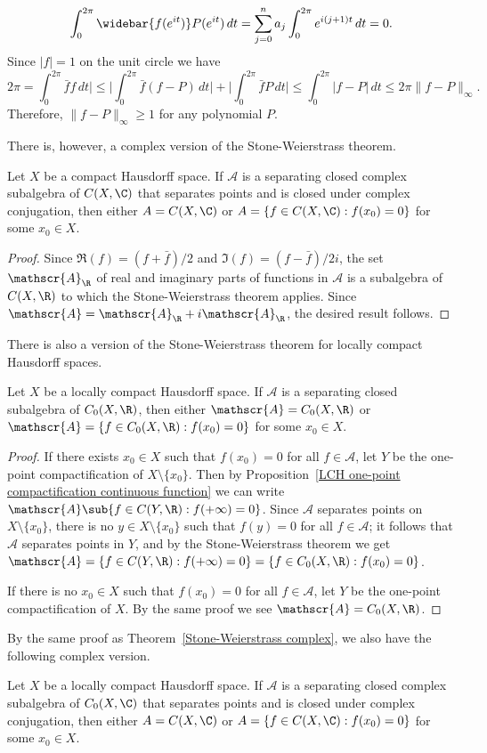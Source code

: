 \[\int_{0}^{2\pi}\widebar{f(e^{it})}P(e^{it})\,dt=\sum_{j=0}^{n}a_j\int_0^{2\pi}e^{i(j+1)t}\,dt=0.\]
Since $|f|=1$ on the unit circle we have
\[2\pi=\int_0^{2\pi}\bar{f}f\,dt\Big|\leq\Big|\int_0^{2\pi}\bar{f}(f-P)\,dt\Big|+\Big|\int_0^{2\pi}\bar{f}P\,dt\Big|\leq\int_0^{2\pi}|f-P|\,dt\leq 2\pi\|f-P\|_\infty.\]
Therefore, $\|f-P\|_\infty\geq 1$ for any polynomial $P$.\par
There is, however, a complex version of the Stone-Weierstrass theorem.
\begin{theorem}\label{Stone-Weierstrass complex}
Let $X$ be a compact Hausdorff space. If $\mathscr{A}$ is a separating closed complex subalgebra of $C(X,\C)$ that separates points and is closed under complex conjugation, then either $A=C(X,\C)$ or $A=\{f\in C(X,\C):f(x_0)=0\}$ for some $x_0\in X$.
\end{theorem}
\begin{proof}
Since $\Re(f)=(f+\bar{f})/2$ and $\Im(f)=(f-\bar{f})/2i$, the set $\mathscr{A}_{\R}$ of real and imaginary parts of functions in $\mathscr{A}$ is a subalgebra of $C(X,\R)$ to which the Stone-Weierstrass theorem applies. Since $\mathscr{A}=\mathscr{A}_{\R}+i\mathscr{A}_{\R}$, the desired result follows.
\end{proof}
There is also a version of the Stone-Weierstrass theorem for locally compact Hausdorff spaces.
\begin{theorem}
Let $X$ be a locally compact Hausdorff space. If $\mathscr{A}$ is a separating closed subalgebra of $C_0(X,\R)$, then either $\mathscr{A}=C_0(X,\R)$ or $\mathscr{A}=\{f\in C_0(X,\R):f(x_0)=0\}$ for some $x_0\in X$.
\end{theorem}
\begin{proof}
If there exists $x_0\in X$ such that $f(x_0)=0$ for all $f\in\mathscr{A}$, let $Y$ be the one-point compactification of $X\setminus\{x_0\}$. Then by Proposition~\ref{LCH one-point compactification continuous function} we can write $\mathscr{A}\sub\{f\in C(Y,\R):f(+\infty)=0\}$. Since $\mathscr{A}$ separates points on $X\setminus\{x_0\}$, there is no $y\in X\setminus\{x_0\}$ such that $f(y)=0$ for all $f\in\mathscr{A}$; it follows that $\mathscr{A}$ separates points in $Y$, and by the Stone-Weierstrass theorem we get $\mathscr{A}=\{f\in C(Y,\R):f(+\infty)=0\}=\{f\in C_0(X,\R):f(x_0)=0\}$.\par
If there is no $x_0\in X$ such that $f(x_0)=0$ for all $f\in\mathscr{A}$, let $Y$ be the one-point compactification of $X$. By the same proof we see $\mathscr{A}=C_0(X,\R)$.
\end{proof}
By the same proof as Theorem~\ref{Stone-Weierstrass complex}, we also have the following complex version.
\begin{theorem}
Let $X$ be a locally compact Hausdorff space. If $\mathscr{A}$ is a separating closed complex subalgebra of $C_0(X,\C)$ that separates points and is closed under complex conjugation, then either $A=C(X,\C)$ or $A=\{f\in C(X,\C):f(x_0)=0\}$ for some $x_0\in X$.
\end{theorem}
